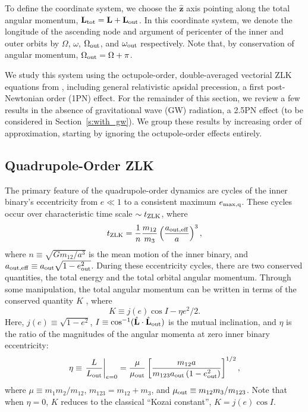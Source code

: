 \documentclass[
        fleqn,
        usenatbib,
    ]{mnras}
\newcommand*{\at}[1]{\left.#1\right|}
\newcommand*{\p}[1]{\left(#1\right)}
\newcommand*{\s}[1]{\left[#1\right]}
\newcommand*{\bm}[1]{\mathbf{#1}}
\newcommand*{\uv}[1]{\hat{\mathbf{#1}}}
\begin{document}
To define the coordinate system, we choose the $\uv{z}$ axis pointing along the
total angular momentum, $\bm{L}_{\rm tot} = \bm{L} + \bm{L}_{\rm out}$. In this
coordinate system, we denote the longitude of the ascending node and argument of
pericenter of the inner and outer orbits by $\Omega$, $\omega$, $\Omega_{\rm
out}$, and $\omega_{\rm out}$ respectively. Note that, by conservation of
angular momentum, $\Omega_{\rm out} = \Omega + \pi$.

We study this system using the octupole-order, double-averaged vectorial ZLK
equations from \citet{LML15}, including general relativistic apsidal precession,
a first post-Newtonian order (1PN) effect. For the remainder of this section, we
review a few results in the absence of gravitational wave (GW) radiation, a
2.5PN effect (to be considered in Section~\ref{s:with_gw}). We group these
results by increasing order of approximation, starting by ignoring the
octupole-order effects entirely.

\subsection{Quadrupole-Order ZLK}

The primary feature of the quadrupole-order dynamics are cycles of the inner
binary's eccentricity from $e \ll 1$ to a consistent maximum $e_{\rm \max, q}$.
These cycles occur over characteristic time scale $\sim t_{\rm ZLK}$, where
\begin{equation}
    t_{\rm ZLK} = \frac{1}{n}\frac{m_{12}}{m_3}
            \p{\frac{a_{\rm out, eff}}{a}}^3,\label{eq:def_tzlk}
\end{equation}
where $n \equiv \sqrt{Gm_{12} / a^3}$ is the mean motion of the inner binary,
and $a_{\rm out, eff} \equiv a_{\rm out}\sqrt{1 - e_{\rm out}^2}$. During these
eccentricity cycles, there are two conserved quantities, the total energy and
the total orbital angular momentum. Through some manipulation, the total angular
momentum can be written in terms of the conserved quantity $K$ \citep{LML15},
where
\begin{equation}
    K \equiv j(e) \cos I - \eta e^2 / 2. \label{eq:def_K}
\end{equation}
Here, $j(e) \equiv \sqrt{1 - e^2}$, $I \equiv \cos^{-1}(\uv{L} \cdot
\uv{L}_{\rm out})$ is the mutual inclination, and $\eta$ is the ratio of the
magnitudes of the angular momenta at zero inner binary eccentricity:
\begin{equation}
    \eta \equiv \at{\frac{L}{L_{\rm out}}}_{e = 0}
        = \frac{\mu}{\mu_{\rm out}}\s{\frac{m_{12}a}
            {m_{123}a_{\rm out}\p{1 - e_{\rm out}^2}}}^{1/2},\label{eq:def_eta}
\end{equation}
where $\mu \equiv m_1m_2 / m_{12}$, $m_{123} = m_{12} + m_3$, and $\mu_{\rm out}
\equiv m_{12} m_3 / m_{123}$. Note that when $\eta = 0$, $K$ reduces to the
classical ``Kozai constant'', $K = j(e) \cos I$.
\end{document}
